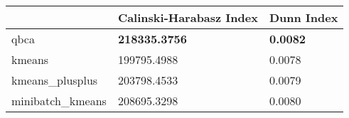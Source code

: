 \begin{table}[htbp]
\centering
\begin{tabular}{lll}
\toprule
 & Calinski-Harabasz Index & Dunn Index \\
\midrule
qbca & \textbf{218335.3756} & \textbf{0.0082} \\
kmeans & 199795.4988 & 0.0078 \\
kmeans_plusplus & 203798.4533 & 0.0079 \\
minibatch_kmeans & 208695.3298 & 0.0080 \\
\bottomrule
\end{tabular}
\end{table}
